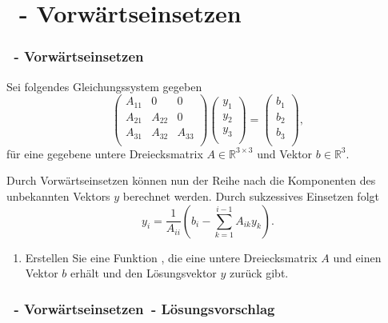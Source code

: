 \def\stitle{\theexercise\ - Vorw\"artseinsetzen}
\section{\stitle}
\begin{frame}%
  \frametitle{\stitle}%
Sei folgendes Gleichungssystem gegeben
\[
\begin{pmatrix}
A_{11} & 0  &  0 \\
A_{21} & A_{22}  &  0 \\
A_{31} & A_{32}  &  A_{33} \\
\end{pmatrix}
\begin{pmatrix}
y_{1} \\
y_{2} \\
y_{3} \\
\end{pmatrix}
=
\begin{pmatrix}
b_{1} \\
b_{2} \\
b_{3} \\
\end{pmatrix}
,
\]
für eine gegebene untere Dreiecksmatrix $ A \in \mathbb{R}^{3\times 3} $ und Vektor $ b \in \mathbb{R}^3 $.
\medskip

Durch Vorw\"artseinsetzen k\"onnen nun der Reihe nach die Komponenten des unbekannten Vektors $y$ berechnet werden.
Durch sukzessives Einsetzen folgt
\[
y_i=\frac{1}{A_{ii}}\left(b_i-\sum_{k=1}^{i-1}A_{ik}y_k\right).
\]
\begin{enumerate}
\item Erstellen Sie eine Funktion , die eine untere Dreiecksmatrix $ A $ und einen Vektor $ b $ erh\"alt und den L\"osungsvektor $ y $ zur\"uck gibt.
\end{enumerate}
\end{frame}


\begin{frame}%
  \frametitle{\stitle\ - L\"osungsvorschlag}%

\end{frame}
